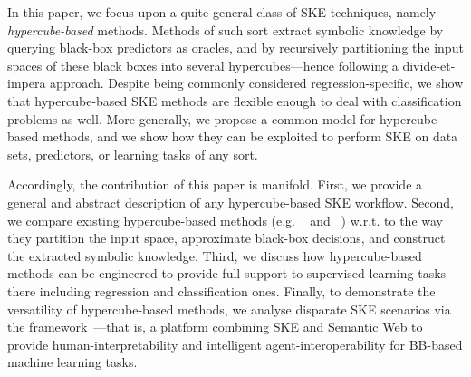 \documentclass[
]{ceurart}
\begin{document}
In this paper, we focus upon a quite general class of SKE techniques, namely \emph{hypercube-based} methods.
%
Methods of such sort extract symbolic knowledge by querying black-box predictors as oracles, and by recursively partitioning the input spaces of these black boxes into several hypercubes---hence following a divide-et-impera approach.
%
Despite being commonly considered regression-specific, we show that hypercube-based SKE methods are flexible enough to deal with classification problems as well.
%
More generally, we propose a common model for hypercube-based methods, and we show how they can be exploited to perform SKE on data sets, predictors, or learning tasks of any sort.

Accordingly, the contribution of this paper is manifold.
%
First, we provide a general and abstract description of any hypercube-based SKE workflow.
%
Second, we compare existing hypercube-based methods (e.g. \iter{}~\cite{huysmans2006iter} and \gridex{}~\cite{gridex-extraamas2021}) w.r.t. to the way they partition the input space, approximate black-box decisions, and construct the extracted symbolic knowledge.
%
Third, we discuss how hypercube-based methods can be engineered to provide full support to supervised learning tasks---there including regression and classification ones.
%
Finally, to 
%
demonstrate the versatility of hypercube-based methods, we analyse disparate SKE scenarios via the \psyke{} framework~\cite{psyke-woa2021,psyke-ia2022,psyke-extraamas2022}---that is, a platform combining SKE and Semantic Web to provide human-interpretability and intelligent agent-interoperability for BB-based machine learning tasks.
%
%
\end{document}
